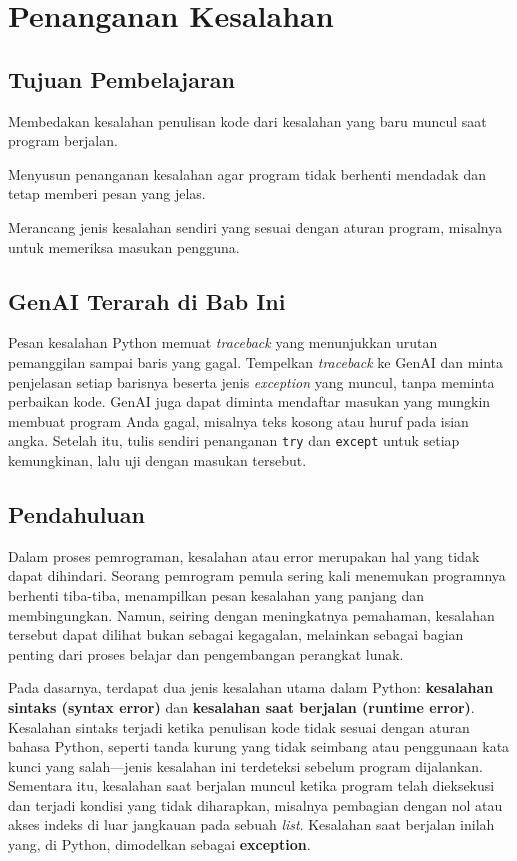\chapter{Penanganan Kesalahan}

\section*{Tujuan Pembelajaran}
\begin{daftarrapat}
  \item Membedakan kesalahan penulisan kode dari kesalahan yang baru muncul saat program berjalan.
  \item Menyusun penanganan kesalahan agar program tidak berhenti mendadak dan tetap memberi pesan yang jelas.
  \item Merancang jenis kesalahan sendiri yang sesuai dengan aturan program, misalnya untuk memeriksa masukan pengguna.
\end{daftarrapat}

\section*{GenAI Terarah di Bab Ini}

Pesan kesalahan Python memuat \textit{traceback} yang menunjukkan urutan pemanggilan sampai baris yang gagal. Tempelkan \textit{traceback} ke GenAI dan minta penjelasan setiap barisnya beserta jenis \textit{exception} yang muncul, tanpa meminta perbaikan kode. GenAI juga dapat diminta mendaftar masukan yang mungkin membuat program Anda gagal, misalnya teks kosong atau huruf pada isian angka. Setelah itu, tulis sendiri penanganan \texttt{try} dan \texttt{except} untuk setiap kemungkinan, lalu uji dengan masukan tersebut.

\section{Pendahuluan}

Dalam proses pemrograman, kesalahan atau error merupakan hal yang tidak dapat dihindari. Seorang pemrogram pemula sering kali menemukan programnya berhenti tiba-tiba, menampilkan pesan kesalahan yang panjang dan membingungkan. Namun, seiring dengan meningkatnya pemahaman, kesalahan tersebut dapat dilihat bukan sebagai kegagalan, melainkan sebagai bagian penting dari proses belajar dan pengembangan perangkat lunak.

Pada dasarnya, terdapat dua jenis kesalahan utama dalam Python: \textbf{kesalahan sintaks (syntax error)} dan \textbf{kesalahan saat berjalan (runtime error)}. Kesalahan sintaks terjadi ketika penulisan kode tidak sesuai dengan aturan bahasa Python, seperti tanda kurung yang tidak seimbang atau penggunaan kata kunci yang salah—jenis kesalahan ini terdeteksi sebelum program dijalankan. Sementara itu, kesalahan saat berjalan muncul ketika program telah dieksekusi dan terjadi kondisi yang tidak diharapkan, misalnya pembagian dengan nol atau akses indeks di luar jangkauan pada sebuah \textit{list}. Kesalahan saat berjalan inilah yang, di Python, dimodelkan sebagai \textbf{exception}.

